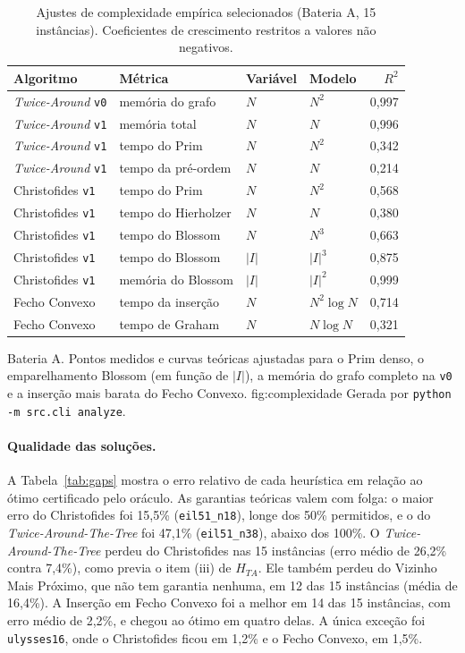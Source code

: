 \begin{table}[htbp]
  \centering
  \caption{Ajustes de complexidade empírica selecionados (Bateria A, 15 instâncias). Coeficientes
  de crescimento restritos a valores não negativos.}
  \label{tab:ajustes}
  \small
  \begin{tabular}{llllr}
    \toprule
    Algoritmo & Métrica & Variável & Modelo & $R^2$ \\
    \midrule
    \textit{Twice-Around} \texttt{v0} & memória do grafo & $N$ & $N^2$ & 0,997 \\
    \textit{Twice-Around} \texttt{v1} & memória total & $N$ & $N$ & 0,996 \\
    \textit{Twice-Around} \texttt{v1} & tempo do Prim & $N$ & $N^2$ & 0,342 \\
    \textit{Twice-Around} \texttt{v1} & tempo da pré-ordem & $N$ & $N$ & 0,214 \\
    Christofides \texttt{v1} & tempo do Prim & $N$ & $N^2$ & 0,568 \\
    Christofides \texttt{v1} & tempo do Hierholzer & $N$ & $N$ & 0,380 \\
    Christofides \texttt{v1} & tempo do Blossom & $N$ & $N^3$ & 0,663 \\
    Christofides \texttt{v1} & tempo do Blossom & $|I|$ & $|I|^3$ & 0,875 \\
    Christofides \texttt{v1} & memória do Blossom & $|I|$ & $|I|^2$ & 0,999 \\
    Fecho Convexo & tempo da inserção & $N$ & $N^2 \log N$ & 0,714 \\
    Fecho Convexo & tempo de Graham & $N$ & $N \log N$ & 0,321 \\
    \bottomrule
  \end{tabular}
\end{table}

{Bateria A. Pontos medidos e curvas teóricas ajustadas para o Prim denso, o emparelhamento
Blossom (em função de $|I|$), a memória do grafo completo na \texttt{v0} e a inserção mais
barata do Fecho Convexo.}
{fig:complexidade}
{Gerada por \texttt{python -m src.cli analyze}.}

\paragraph{Qualidade das soluções.}
A Tabela~\ref{tab:gaps} mostra o erro relativo de cada heurística em relação ao ótimo
certificado pelo oráculo. As garantias teóricas valem com folga: o maior erro do Christofides
foi 15,5\% (\texttt{eil51\_n18}), longe dos 50\% permitidos, e o do \textit{Twice-Around-The-Tree}
foi 47,1\% (\texttt{eil51\_n38}), abaixo dos 100\%. O \textit{Twice-Around-The-Tree} perdeu do
Christofides nas 15 instâncias (erro médio de 26,2\% contra 7,4\%), como previa o item (iii) de
$H_{TA}$. Ele também perdeu do Vizinho Mais Próximo, que não tem garantia nenhuma, em 12 das 15
instâncias (média de 16,4\%). A Inserção em Fecho Convexo foi a melhor em 14 das 15 instâncias,
com erro médio de 2,2\%, e chegou ao ótimo em quatro delas. A única exceção foi
\texttt{ulysses16}, onde o Christofides ficou em 1,2\% e o Fecho Convexo, em 1,5\%.

